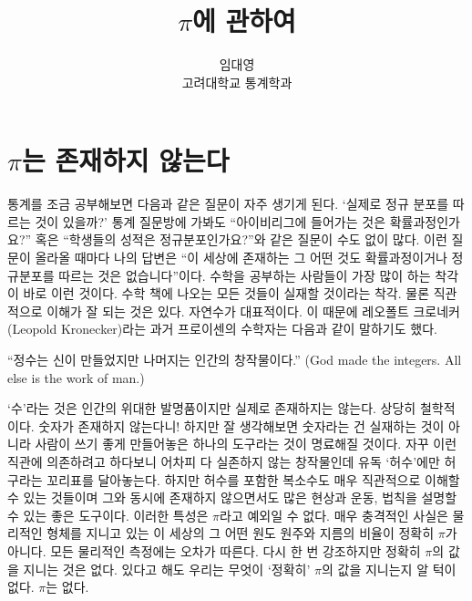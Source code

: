 \documentclass[10pt]{article}
\begin{document}
\nocite{*}

\title{$\pi$에 관하여}
\author{임대영 \\ 고려대학교 통계학과}
\maketitle

\section{$\pi$는 존재하지 않는다}
통계를 조금 공부해보면 다음과 같은 질문이 자주 생기게 된다. `실제로 정규 분포를 따르는 것이 있을까?' 통계 질문방에 가봐도 ``아이비리그에 들어가는 것은 확률과정인가요?'' 혹은 ``학생들의 성적은 정규분포인가요?''와 같은 질문이 수도 없이 많다. 이런 질문이 올라올 때마다 나의 답변은 ``이 세상에 존재하는 그 어떤 것도 확률과정이거나 정규분포를 따르는 것은 없습니다''이다. 수학을 공부하는 사람들이 가장 많이 하는 착각이 바로 이런 것이다. 수학 책에 나오는 모든 것들이 실재할 것이라는 착각. 물론 직관적으로 이해가 잘 되는 것은 있다. 자연수가 대표적이다. 이 때문에 레오폴트 크로네커(Leopold Kronecker)라는 과거 프로이센의 수학자는 다음과 같이 말하기도 했다.
\begin{center}
  ``정수는 신이 만들었지만 나머지는 인간의 창작물이다.'' (God made the integers. All else is the work of man.)
\end{center}
 `수'라는 것은 인간의 위대한 발명품이지만 실제로 존재하지는 않는다. 상당히 철학적이다. 숫자가 존재하지 않는다니! 하지만 잘 생각해보면 숫자라는 건 실재하는 것이 아니라 사람이 쓰기 좋게 만들어놓은 하나의 도구라는 것이 명료해질 것이다. 자꾸 이런 직관에 의존하려고 하다보니 어차피 다 실존하지 않는 창작물인데 유독 `허수'에만 허구라는 꼬리표를 달아놓는다. 하지만 허수를 포함한 복소수도 매우 직관적으로 이해할 수 있는 것들이며 그와 동시에 존재하지 않으면서도 많은 현상과 운동, 법칙을 설명할 수 있는 좋은 도구이다. 이러한 특성은 $\pi$라고 예외일 수 없다. 매우 충격적인 사실은 물리적인 형체를 지니고 있는 이 세상의 그 어떤 원도 원주와 지름의 비율이 정확히 $\pi$가 아니다. 모든 물리적인 측정에는 오차가 따른다. 다시 한 번 강조하지만 정확히 $\pi$의 값을 지니는 것은 없다. 있다고 해도 우리는 무엇이 `정확히' $\pi$의 값을 지니는지 알 턱이 없다. $\pi$는 없다.
\end{document}
